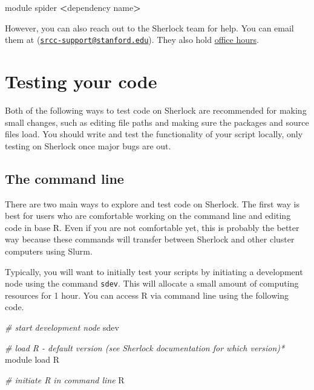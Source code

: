\documentclass[
]{book}
\newenvironment{Shaded}{\begin{snugshade}}{\end{snugshade}}
\newcommand{\CommentTok}[1]{\textcolor[rgb]{0.56,0.35,0.01}{\textit{#1}}}
\newcommand{\ExtensionTok}[1]{#1}
\newcommand{\NormalTok}[1]{#1}
\newcommand{\OperatorTok}[1]{\textcolor[rgb]{0.81,0.36,0.00}{\textbf{#1}}}
\begin{document}
\begin{Shaded}
\begin{Highlighting}[]
\ExtensionTok{module}\NormalTok{ spider }\OperatorTok{\textless{}}\NormalTok{dependency name}\OperatorTok{\textgreater{}}
\end{Highlighting}
\end{Shaded}

However, you can also reach out to the Sherlock team for help. You can email them at (\href{mailto:srcc-support@stanford.edu}{\nolinkurl{srcc-support@stanford.edu}}). They also hold \href{https://jumpstartsrcc.sites.stanford.edu/events/series/sherlock-office-hours}{office hours}.

\hypertarget{testing-your-code}{%
\section{Testing your code}\label{testing-your-code}}

Both of the following ways to test code on Sherlock are recommended for making small changes, such as editing file paths and making sure the packages and source files load. You should write and test the functionality of your script locally, only testing on Sherlock once major bugs are out.

\hypertarget{the-command-line}{%
\subsection{The command line}\label{the-command-line}}

There are two main ways to explore and test code on Sherlock. The first way is best for users who are comfortable working on the command line and editing code in base R. Even if you are not comfortable yet, this is probably the better way because these commands will transfer between Sherlock and other cluster computers using Slurm.

Typically, you will want to initially test your scripts by initiating a development node using the command \texttt{sdev}. This will allocate a small amount of computing resources for 1 hour. You can access R via command line using the following code.

\begin{Shaded}
\begin{Highlighting}[]
\CommentTok{\# start development node}
\ExtensionTok{sdev}

\CommentTok{\# load R {-} default version (see Sherlock documentation for which version)*}
\ExtensionTok{module}\NormalTok{ load R}

\CommentTok{\# initiate R in command line}
\ExtensionTok{R}
\end{Highlighting}
\end{Shaded}
\end{document}
